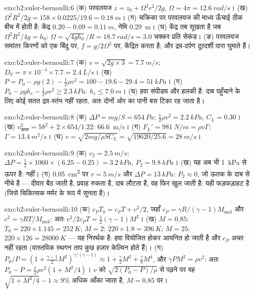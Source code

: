 \begin{solution}{exo:b2:euler-bernoulli:6}
(क) परवलयज $z = z_0 + \Omega^2r^2/2g$, $\Omega = 4\pi = \qty{12.6}{rad/s}$। (ख)
$\Omega^2R^2/2g = 158 \times 0.0225/19.6 = \qty{0.18}{m}$। (ग) चक्रिका पर परवलयज की
माध्य ऊँचाई ठीक बीच में होती है: केंद्र $0.20 - 0.09 = \qty{0.11}{m}$, नेमि
\qty{0.29}{m}। (घ) केंद्र तब सूखता है जब $\Omega^2R^2/4g = h_0$: $\Omega = \sqrt{4gh_0}/R =
\qty{18.7}{rad/s} = 3.0$ चक्कर प्रति सेकंड। (ङ) परवलयज
समांतर किरणों को एक बिंदु पर, $f = g/2\Omega^2$ पर, केंद्रित करता है; और
द्रव-दर्पण दूरदर्शी पारा घुमाते हैं।
\end{solution}

\begin{solution}{exo:b2:euler-bernoulli:7}
(क) $v = \sqrt{2g \times 3} = \qty{7.7}{m/s}$; $D_V = \pi \times 10^{-4} \times 7.7 =
\qty{2.4}{L/s}$। (ख) $P = P_0 - \rho g(2) - \tfrac12\rho v^2 = 100 - 19.6 - 29.4 =
\qty{51}{kPa}$। (ग) $P_0 - \rho gh_c - \tfrac12\rho v^2 \ge \qty{2.3}{kPa}$: $h_c \le
\qty{7.0}{m}$। (घ) हवा संपीड्य और हलकी है: दाब पहुँचाने के लिए कोई सतत
द्रव-स्तंभ नहीं रहता, अतः दोनों ओर का पानी बस टिका रह जाता है।
\end{solution}

\begin{solution}{exo:b2:euler-bernoulli:8}
(क) $\Delta P = mg/S = \qty{654}{Pa}$; $\tfrac12\rho v^2 = \qty{2.2}{kPa}$, $C_L = 0.30$।
(ख) $v_{\text{ऊपर}}^2 = 58^2 + 2 \times 654/1.22$: \qty{66.6}{m/s}। (ग) $F_L' =
\qty{981}{N/m} = \rho v\Gamma$: $\Gamma = \qty{13.4}{m^2/s}$। (घ) $v = \sqrt{2mg/
\rho SC_L} = \sqrt{19620/25.6} = \qty{28}{m/s}$।
\end{solution}

\begin{solution}{exo:b2:euler-bernoulli:9}
(क) $v_2 = \qty{2.5}{m/s}$; $\Delta P = \tfrac12 \times 1060 \times (6.25 - 0.25) =
\qty{3.2}{kPa}$, $P_2 = \qty{9.8}{kPa}$। (ख) यह अब भी \qty{1}{kPa} से ऊपर है: नहीं। (ग)
\qty{0.05}{cm^2} पर $v = \qty{5}{m/s}$ और $\Delta P = \qty{13}{kPa}$: $P_2 \approx 0$, जो
ऊतक के दाब से नीचे है --- दीवार बैठ जाती है, प्रवाह रुकता है,
दाब लौटता है, वह फिर खुल जाती है: यही फड़फड़ाहट है (जिसे चिकित्सक मर्मर के रूप में सुनता है)।
\end{solution}

\begin{solution}{exo:b2:euler-bernoulli:10}
(क) $c_PT_0 = c_PT + v^2/2$, जहाँ $c_P = \gamma R/(\gamma - 1)M_{\text{mol}}$ और
$c^2 = \gamma RT/M_{\text{mol}}$: अतः $v^2/2c_PT = \tfrac12(\gamma - 1)M^2$। (ख) $M =
0.85$: $T_0 = 220 \times 1.145 = \qty{252}{K}$; $M = 2$: $220 \times 1.8 = \qty{396}{K}$;
$M = 25$: $220 \times 126 = \qty{28000}{K}$ --- यह निरर्थक है: हवा वियोजित होकर
आयनित हो जाती है और $c_P$ अचर नहीं रहता (वास्तविक स्थगन ताप
कुछ हज़ार केल्विन होते हैं)। (ग) $P_0/P = (1 + \tfrac{\gamma - 1}2M^2)^{\gamma/(\gamma
- 1)} \approx 1 + \tfrac{\gamma}2M^2 + \tfrac{\gamma}8M^4$, और $\gamma PM^2 = \rho v^2$:
अतः $P_0 - P = \tfrac12\rho v^2(1 + M^2/4)$। $v$ को $\sqrt{2(P_0 - P)/\rho}$ से पढ़ने पर
वह $\sqrt{1 + M^2/4} - 1 \approx 9\%$ अधिक आँका जाता है, $M = 0.85$ पर।
\end{solution}

